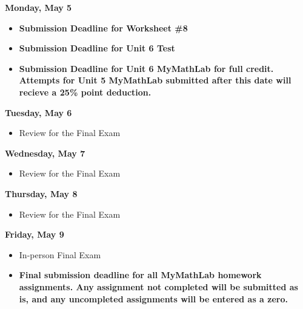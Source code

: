 \documentclass[11pt]{article}
\begin{document}
\textbf{Monday, May 5}

\begin{itemize}
\item \textbf{Submission Deadline for Worksheet \#8}
\item \textbf{Submission Deadline for Unit 6 Test}
\item \textbf{Submission Deadline for Unit 6 MyMathLab for full credit. Attempts for Unit 5 MyMathLab submitted after this date will recieve a 25\% point deduction.}
\end{itemize}

\textbf{Tuesday, May 6}

\begin{itemize}
\item Review for the Final Exam
\end{itemize}

\textbf{Wednesday, May 7}

\begin{itemize}
\item Review for the Final Exam
\end{itemize}

\textbf{Thursday, May 8}

\begin{itemize}
\item Review for the Final Exam
\end{itemize}

\textbf{Friday, May 9}

\begin{itemize}
\item In-person Final Exam
\item \textbf{Final submission deadline for all MyMathLab homework assignments. Any assignment not completed will be submitted as is, and any uncompleted assignments will be entered as a zero.}
\end{itemize}
\end{document}
